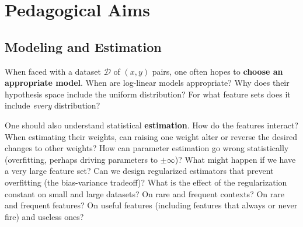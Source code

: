 \documentclass[11pt,letterpaper]{article}
\newcommand{\Data}[0]{\ensuremath{\mathcal{D}}}
\begin{document}

\section{Pedagogical Aims}\label{sec:aims}

\subsection{Modeling and Estimation}

When faced with a dataset $\Data{}$ of $(x, y)$ pairs, one often hopes
to \textbf{choose an appropriate model}.  When are log-linear
models appropriate?
Why does their hypothesis space include the uniform distribution?  For
what feature sets does it include {\em every} distribution?  

One should also understand statistical \textbf{estimation}.  How do
the features interact?  When estimating their weights, can raising one
weight alter or reverse the desired changes to other weights?  How can
parameter estimation go wrong statistically (overfitting, perhaps
driving parameters to $\pm\infty$)?  What might happen if we have a
very large feature set?  Can we design regularized estimators that
prevent overfitting (the bias-variance tradeoff)?  What is the effect
of the regularization constant on small and large datasets?  On rare
and frequent contexts?  On rare and frequent features?  On useful
features (including features that always or never fire) and useless
ones?


\end{document}
